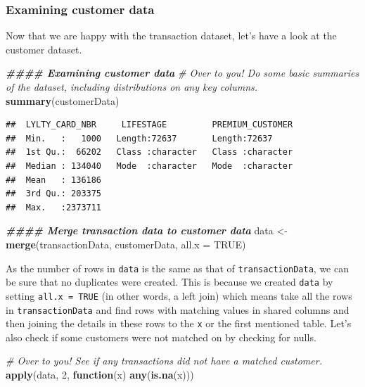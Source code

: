 \documentclass[
]{article}
\newenvironment{Shaded}{\begin{snugshade}}{\end{snugshade}}
\newcommand{\AttributeTok}[1]{\textcolor[rgb]{0.13,0.29,0.53}{#1}}
\newcommand{\CommentTok}[1]{\textcolor[rgb]{0.56,0.35,0.01}{\textit{#1}}}
\newcommand{\ConstantTok}[1]{\textcolor[rgb]{0.56,0.35,0.01}{#1}}
\newcommand{\ControlFlowTok}[1]{\textcolor[rgb]{0.13,0.29,0.53}{\textbf{#1}}}
\newcommand{\DecValTok}[1]{\textcolor[rgb]{0.00,0.00,0.81}{#1}}
\newcommand{\DocumentationTok}[1]{\textcolor[rgb]{0.56,0.35,0.01}{\textbf{\textit{#1}}}}
\newcommand{\FunctionTok}[1]{\textcolor[rgb]{0.13,0.29,0.53}{\textbf{#1}}}
\newcommand{\NormalTok}[1]{#1}
\newcommand{\OtherTok}[1]{\textcolor[rgb]{0.56,0.35,0.01}{#1}}
\begin{document}
\subsubsection{Examining customer data}\label{examining-customer-data}

Now that we are happy with the transaction dataset, let's have a look at
the customer dataset.

\begin{Shaded}
\begin{Highlighting}[]
\DocumentationTok{\#\#\#\# Examining customer data}
\CommentTok{\# Over to you! Do some basic summaries of the dataset, including distributions on any key columns.}
\FunctionTok{summary}\NormalTok{(customerData)}
\end{Highlighting}
\end{Shaded}

\begin{verbatim}
##  LYLTY_CARD_NBR     LIFESTAGE         PREMIUM_CUSTOMER  
##  Min.   :   1000   Length:72637       Length:72637      
##  1st Qu.:  66202   Class :character   Class :character  
##  Median : 134040   Mode  :character   Mode  :character  
##  Mean   : 136186                                        
##  3rd Qu.: 203375                                        
##  Max.   :2373711
\end{verbatim}

\begin{Shaded}
\begin{Highlighting}[]
\DocumentationTok{\#\#\#\# Merge transaction data to customer data}
\NormalTok{data }\OtherTok{\textless{}{-}} \FunctionTok{merge}\NormalTok{(transactionData, customerData, }\AttributeTok{all.x =} \ConstantTok{TRUE}\NormalTok{)}
\end{Highlighting}
\end{Shaded}

As the number of rows in \texttt{data} is the same as that of
\texttt{transactionData}, we can be sure that no duplicates were
created. This is because we created \texttt{data} by setting
\texttt{all.x\ =\ TRUE} (in other words, a left join) which means take
all the rows in \texttt{transactionData} and find rows with matching
values in shared columns and then joining the details in these rows to
the \texttt{x} or the first mentioned table. Let's also check if some
customers were not matched on by checking for nulls.

\begin{Shaded}
\begin{Highlighting}[]
\CommentTok{\# Over to you! See if any transactions did not have a matched customer.}
\FunctionTok{apply}\NormalTok{(data, }\DecValTok{2}\NormalTok{, }\ControlFlowTok{function}\NormalTok{(x) }\FunctionTok{any}\NormalTok{(}\FunctionTok{is.na}\NormalTok{(x)))}
\end{Highlighting}
\end{Shaded}
\end{document}
